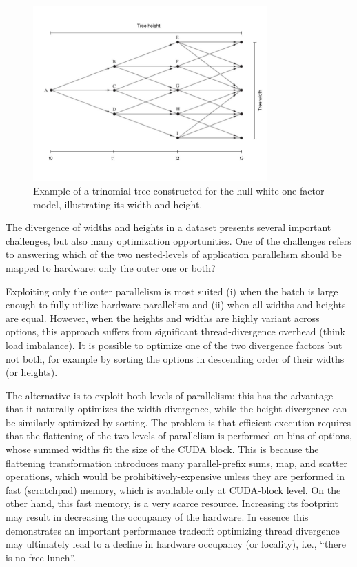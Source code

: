 \begin{figure}[H]
	\centering
	\includegraphics[width=0.8\textwidth]{img/treeconststage1wh.jpg}
	\caption{Example of a trinomial tree constructed for the hull-white one-factor model, illustrating its width and height.}
	\label{fig:intro:tree}
\end{figure}

The divergence of widths and heights in a dataset presents several important challenges, but also many optimization opportunities. One of the challenges refers to answering which of the two nested-levels of application parallelism should be mapped to hardware: only the outer one or both? 

Exploiting only the outer parallelism is most suited (i) when the batch is large enough to fully utilize hardware parallelism and (ii) when all widths and heights are equal. However, when the heights and widths are highly variant across options, this approach suffers from significant thread-divergence overhead (think load imbalance). It is possible to optimize one of the two divergence factors but not both, for example by sorting the options in descending order of their widths (or heights).

The alternative is to exploit both levels of parallelism; this has the advantage that it naturally optimizes the width divergence, while the height divergence can be similarly optimized by sorting.   The problem is that efficient execution requires that the flattening of the two levels of parallelism is performed on bins of options, whose summed widths fit the size of the CUDA block.  This is because the flattening transformation introduces many parallel-prefix sums, map, and scatter operations, which would be prohibitively-expensive unless they are performed in fast (scratchpad) memory, which is available only at CUDA-block level. On the other hand, this fast memory, is a very scarce resource.   Increasing its footprint may result in decreasing the occupancy of the hardware.  In essence this demonstrates an important performance tradeoff: optimizing thread divergence may ultimately lead to a decline in hardware occupancy (or locality), i.e., ``there is no free lunch''.

